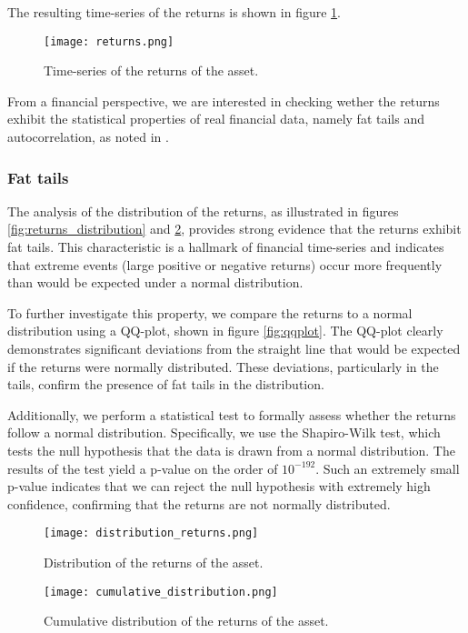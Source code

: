 The resulting time-series of the returns is shown in figure \ref{fig:returns}.

\begin{figure}[H]
    \centering
    \texttt{[image: returns.png]}
    \caption{Time-series of the returns of the asset.}
    \label{fig:returns}
\end{figure}

From a financial perspective, we are interested in checking wether the returns exhibit the statistical properties of real financial data, namely fat tails and autocorrelation, as noted in \cite{bouchaud2000theory}.

\subsubsection{Fat tails}
The analysis of the distribution of the returns, as illustrated in figures \ref{fig:returns_distribution} and \ref{fig:cumulative_returns_distribution}, provides strong evidence that the returns exhibit fat tails. This characteristic is a hallmark of financial time-series and indicates that extreme events (large positive or negative returns) occur more frequently than would be expected under a normal distribution.

To further investigate this property, we compare the returns to a normal distribution using a QQ-plot, shown in figure \ref{fig:qqplot}. The QQ-plot clearly demonstrates significant deviations from the straight line that would be expected if the returns were normally distributed. These deviations, particularly in the tails, confirm the presence of fat tails in the distribution.

Additionally, we perform a statistical test to formally assess whether the returns follow a normal distribution. Specifically, we use the Shapiro-Wilk test, which tests the null hypothesis that the data is drawn from a normal distribution. The results of the test yield a p-value on the order of $10^{-192}$. Such an extremely small p-value indicates that we can reject the null hypothesis with extremely high confidence, confirming that the returns are not normally distributed.
\begin{figure}[H]
    \centering
    \begin{minipage}{0.45\textwidth}
        \centering
        \texttt{[image: distribution\_returns.png]}
        \caption{Distribution of the returns of the asset.}
        \label{fig:returns_distribution}
    \end{minipage}
    \hfill
    \begin{minipage}{0.45\textwidth}
        \centering
        \texttt{[image: cumulative\_distribution.png]}
        \caption{Cumulative distribution of the returns of the asset.}
        \label{fig:cumulative_returns_distribution}
    \end{minipage}
\end{figure}


